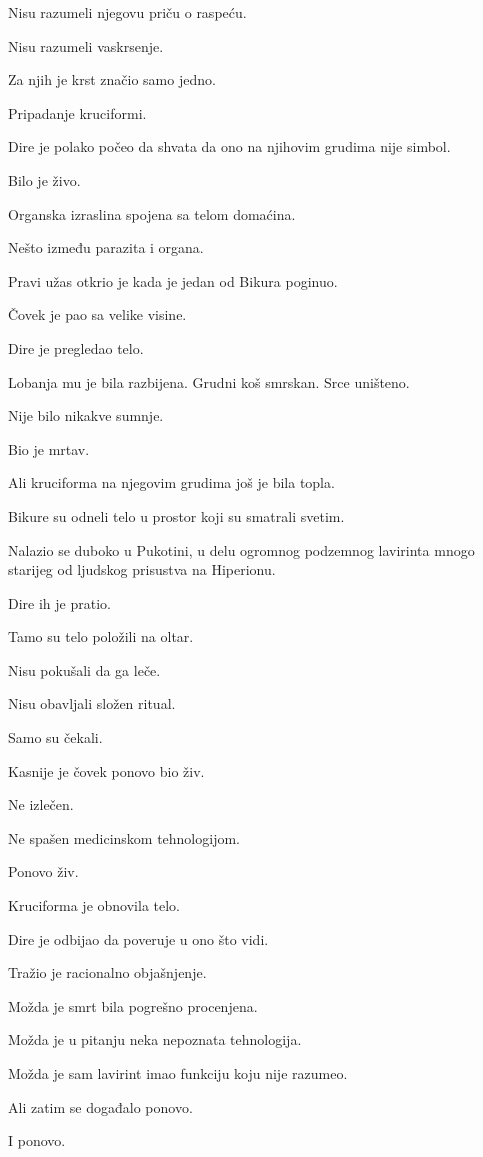 Nisu razumeli njegovu priču o raspeću.

Nisu razumeli vaskrsenje.

Za njih je krst značio samo jedno.

Pripadanje kruciformi.

Dire je polako počeo da shvata da ono na njihovim grudima nije simbol.

Bilo je živo.

Organska izraslina spojena sa telom domaćina.

Nešto između parazita i organa.

Pravi užas otkrio je kada je jedan od Bikura poginuo.

Čovek je pao sa velike visine.

Dire je pregledao telo.

Lobanja mu je bila razbijena. Grudni koš smrskan. Srce uništeno.

Nije bilo nikakve sumnje.

Bio je mrtav.

Ali kruciforma na njegovim grudima još je bila topla.

Bikure su odneli telo u prostor koji su smatrali svetim.

Nalazio se duboko u Pukotini, u delu ogromnog podzemnog lavirinta mnogo starijeg od ljudskog prisustva na Hiperionu.

Dire ih je pratio.

Tamo su telo položili na oltar.

Nisu pokušali da ga leče.

Nisu obavljali složen ritual.

Samo su čekali.

Kasnije je čovek ponovo bio živ.

Ne izlečen.

Ne spašen medicinskom tehnologijom.

Ponovo živ.

Kruciforma je obnovila telo.

Dire je odbijao da poveruje u ono što vidi.

Tražio je racionalno objašnjenje.

Možda je smrt bila pogrešno procenjena.

Možda je u pitanju neka nepoznata tehnologija.

Možda je sam lavirint imao funkciju koju nije razumeo.

Ali zatim se događalo ponovo.

I ponovo.

